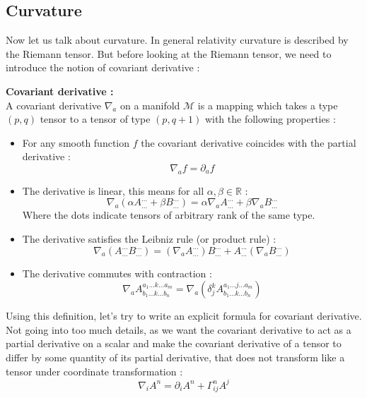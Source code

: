 \documentclass[a4paper,12pt]{article}
\theoremstyle{definition}
\begin{document}
\subsection{Curvature}
Now let us talk about curvature. In general relativity curvature is described by the Riemann tensor.
But before looking at the Riemann tensor, we need to introduce the notion of covariant derivative :
\begin{definition}
	\textbf{Covariant derivative :}\\
	A covariant derivative $\nabla_a$ on a manifold $\mathcal{M}$ is a mapping which takes a type $(p,q)$ tensor to a tensor of type $(p,q+1)$ with the following properties :
	\begin{itemize}
		\item For any smooth function $f$ the covariant derivative coincides with the partial derivative :
		\begin{equation}
			\nabla_af=\partial_af
		\end{equation}
		\item The derivative is linear, this means for all $\alpha,\beta \in \mathbb{R}$ :
		\begin{equation}
			\nabla_a(\alpha A^{...}_{...}+\beta B^{...}_{...})=\alpha \nabla_a A^{...}_{...}+\beta\nabla_a B^{...}_{...}
		\end{equation}
		Where the dots indicate tensors of arbitrary rank of the same type.
		\item The derivative satisfies the Leibniz rule (or product rule) :
		\begin{equation}
			\nabla_a(A^{...}_{...}B^{...}_{...})=(\nabla_aA^{...}_{...})B^{...}_{...}+A^{...}_{...}(\nabla_aB^{...}_{...})
		\end{equation}
		\item The derivative commutes with contraction :
		\begin{equation}
			\nabla_aA^{a_1...k...a_m}_{b_1...k...b_n}=\nabla_a(\delta^k_jA^{a_1...j...a_m}_{b_1...k...b_n})
		\end{equation}
	\end{itemize}
\end{definition}
Using this definition, let's try to write an explicit formula for covariant derivative.
Not going into too much details, as we want the covariant derivative to act as a partial derivative on a scalar and make the covariant derivative of a tensor to differ by some quantity of its partial derivative, that does not transform like a tensor under coordinate transformation :
\begin{equation}
	\nabla_iA^n=\partial_iA^n+\Gamma^n_{ij}A^j
\end{equation}
\end{document}
